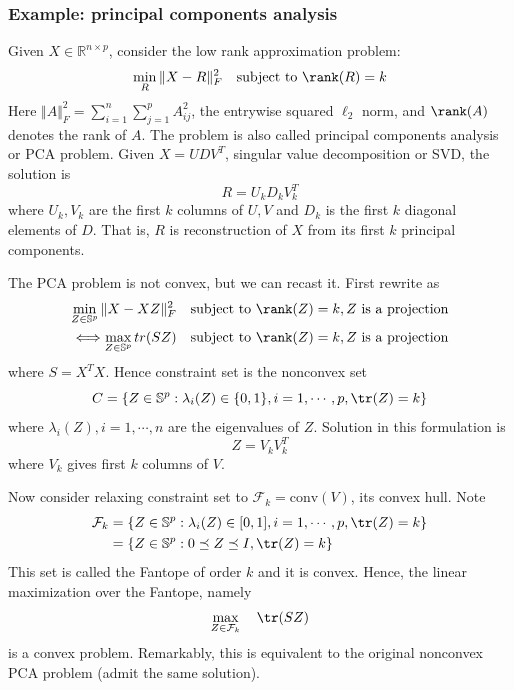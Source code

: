 \documentclass[a4paper]{article}
\begin{document}
{\subsubsection{Example: principal components analysis}
Given $X \in \mathbb{R}^{n \times p}$, consider the low rank approximation problem:
\begin{equation}
  \min_R \Vert X - R \Vert^2_F \quad \text{subject to} \ \rank(R) = k \nonumber
\end{equation} 
Here $\Vert A\Vert^2_F = \sum_{i=1}^n \sum_{j=1}^p A_{ij}^2$, the entrywise squared $\ell_2$ norm, and $\rank(A)$ denotes the rank of $A$. The problem is also called principal components analysis or PCA problem. Given $X = UDV^T$, singular value decomposition or SVD, the solution is
\begin{equation}
  R = U_k D_k V_k^T \nonumber
\end{equation}
where $U_k, V_k$ are the first $k$ columns of $U, V$ and $D_k$ is the first $k$ diagonal elements of $D$. That is, $R$ is reconstruction of $X$ from its first $k$ principal components.

The PCA problem is not convex, but we can recast it. First rewrite as
\begin{equation}
  \begin{aligned}
  \min_{Z \in \mathbb{S}^p} \Vert X - XZ \Vert^2_F \quad \text{subject to} \ \rank(Z) = k, Z \ \text{is a projection} \\
  \Longleftrightarrow \max_{Z \in \mathbb{S}^p} tr(SZ) \quad \text{subject to} \ \rank(Z) = k, Z \ \text{is a projection} \nonumber 
  \end{aligned}
\end{equation} 
where $S = X^T X$. Hence constraint set is the nonconvex set
\begin{equation}
  C = \{ Z \in   \mathbb{S}^p : \lambda_i(Z) \in \{0, 1\}, i = 1,\cdots, p, \tr(Z) = k \} \nonumber
\end{equation}
where $\lambda_i(Z), i = 1,\cdots, n$ are the eigenvalues of $Z$. Solution in this formulation is 
\begin{equation}
  Z = V_k V_k^T \nonumber
\end{equation}
where $V_k$ gives first $k$ columns of $V$.

Now consider relaxing constraint set to $\mathcal{F}_k = \text{conv}(V)$, its convex hull. Note 
\begin{equation}
  \begin{aligned}
  \mathcal{F}_k & = \{ Z \in   \mathbb{S}^p : \lambda_i(Z) \in [0, 1], i = 1,\cdots, p, \tr(Z) = k \} \nonumber \\
   & = \{ Z \in   \mathbb{S}^p : 0 \preceq Z \preceq I, \tr(Z) = k \} 
  \end{aligned}
\end{equation}
This set is called the Fantope of order $k$ and it is convex. Hence, the linear maximization over the Fantope, namely
\begin{equation}
  \max_{Z \in  \mathcal{F}_k} \quad \tr(SZ) \nonumber
\end{equation}
is a convex problem. Remarkably, this is equivalent to the original nonconvex PCA problem (admit the same solution).

}
\end{document}

